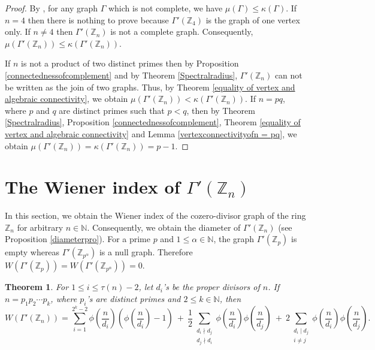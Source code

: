 \documentclass{amsart}
\theoremstyle{plain}
\newtheorem{theorem}{Theorem}[section]
\theoremstyle{definition}
\theoremstyle{remark}
\begin{document}
\begin{proof}
By \cite{kirkland2002graphs}, for any graph $\Gamma$ which is not complete, we have  $\mu(\Gamma) \le \kappa(\Gamma)$. If $n=4$ then there is nothing to prove because $\Gamma'(\mathbb{Z}_4)$ is the graph of one vertex only. If $n \ne 4$ then $\Gamma'(\mathbb{Z}_n)$ is not a complete graph. Consequently, $\mu(\Gamma'(\mathbb{Z}_n)) \le \kappa(\Gamma'(\mathbb{Z}_n))$.

If $n$ is not a product of two distinct primes then by Proposition \ref{connectednessofcomplement} and by Theorem \ref{Spectralradius}, $\Gamma'(\mathbb{Z}_n)$ can not be written as the join of two graphs. Thus, by Theorem \ref{equality of vertex and algebraic connectivity}, we obtain $\mu(\Gamma'(\mathbb{Z}_n)) < \kappa(\Gamma'(\mathbb{Z}_n))$. If $n=pq$, where $p$ and $q$ are distinct primes such that $p<q$, then by Theorem \ref{Spectralradius}, Proposition \ref{connectednessofcomplement}, Theorem \ref{equality of vertex and algebraic connectivity} and Lemma \ref{vertexconnectivityofn = pq}, we obtain $\mu(\Gamma'(\mathbb{Z}_n)) = \kappa(\Gamma'(\mathbb{Z}_n)) = p-1$.  
\end{proof}
\section{The Wiener index of $\Gamma'(\mathbb{Z}_n)$}
In this section, we obtain the Wiener index of the cozero-divisor graph of the ring $\mathbb{Z}_{n}$ for arbitrary $n \in \mathbb{N}$. Consequently, we obtain the diameter of $\Gamma'(\mathbb{Z}_n)$ (see Proposition \ref{diameterpro}). For a prime $p$ and $1 \le \alpha \in \mathbb{N}$,  the graph $\Gamma'(\mathbb{Z}_p)$ is empty whereas $\Gamma'(\mathbb{Z}_{p^{\alpha}})$ is a null graph. Therefore $W(\Gamma'(\mathbb{Z}_p)) = W(\Gamma'(\mathbb{Z}_{p^\alpha})) = 0$.

\begin{theorem}\label{n=p_1p_2...p_k}
For $ 1 \le i \le \tau(n)-2$, let $d_i$'s be the proper divisors of $n$. If $n = p_1p_2 \cdots p_k$, where $p_i$'s are distinct primes and $2 \le k \in \mathbb{N}$, then \[W(\Gamma'(\mathbb{Z}_n)) = \sum_{i=1}^{2^k-2} \phi(\dfrac{n}{d_i})\left(\phi(\dfrac{n}{d_i})-1\right) \ + \  \dfrac{1}{2}\sum_{\substack{d_i \nmid d_j \\ d_j \nmid d_i}} \phi(\dfrac{n}{d_i})\phi(\dfrac{n}{d_j}) \ + \ 2\sum_{\substack{d_i \mid d_j \\ i\neq j}} \phi(\dfrac{n}{d_i})\phi(\dfrac{n}{d_j}).\]
\end{theorem}
\end{document}
